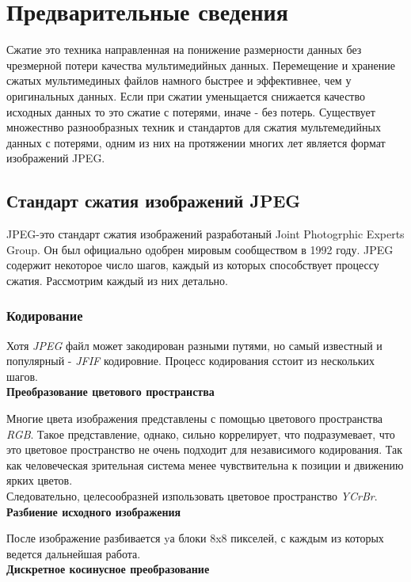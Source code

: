 \documentclass{matmex-diploma-custom}
\begin{document}
\section{Предварительные сведения}
Сжатие это техника направленная на понижение размерности данных без  чрезмерной потери качества мультимедийных данных.
Перемещение и хранение сжатых мультимединых  файлов намного быстрее  и эффективнее, чем у оригинальных данных. Если при сжатии уменьщается снижается качество исходных данных то это сжатие с потерями, иначе - без потерь. Существует множестнво разнообразных  техник и стандартов для сжатия мультемедийных данных с потерями, одним из них на протяжении многих лет является формат изображений JPEG.
\subsection{Стандарт сжатия изображений JPEG}
JPEG-это стандарт сжатия изображений разработаный Joint Photogrphic Experts Group. Он был официально одобрен мировым сообществом в 1992 году. JPEG содержит некоторое число шагов, каждый из которых способствует процессу сжатия.
Рассмотрим каждый из них детально.
\subsubsection{Кодирование}
Хотя \textit{JPEG} файл может закодирован разными путями, но самый известный и популярный - \textit{JFIF} кодировние.
Процесс кодирования сстоит из нескольких шагов.\\

\textbf{Преобразование цветового пространства} \newline

Многие цвета изображения представлены с помощью цветового пространства \textit{RGB}. Такое представление, однако, сильно коррелирует, что подразумевает, что это цветовое пространство не очень подходит для независимого кодирования. Так как человеческая зрительная система менее чувствительна к позиции и движению ярких  цветов. \\
Следовательно, целесообразней изпользовать цветовое пространство \textit{YCrBr}.\\

\textbf{Разбиение исходного изображения}\newline

После изображение разбивается yа блоки 8x8 пикселей, с каждым из которых ведется дальнейшая работа.\\

\textbf{Дискретное косинусное преобразование}\newline
\end{document}
